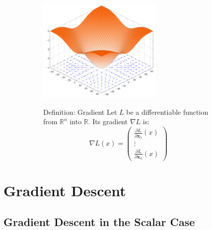 \documentclass{book}
\newcommand{\x}{\mathbf{x}}
\newcommand{\loss}{L}
\newcommand{\R}{\mathbb{R}}
\begin{document}
\begin{figure}[h]
    \centering
    \begin{subfigure}{.6\textwidth}
        \includegraphics[height=5cm]{3d-gradient-cos.png}
    \end{subfigure}
    \begin{subfigure}{.4\textwidth}
        \begin{block}{Definition: Gradient}
        Let $\loss$ be a differentiable function from $\R^n$ into $\R$. Its gradient $\nabla\loss$ is:
        \[
        \nabla \loss (x) =
        \begin{pmatrix}
        \frac{\partial \loss}{\partial \x_1}(x) \\
        \vdots \\
        \frac{\partial \loss}{\partial \x_n}(x)
        \end{pmatrix}
        \]
        \end{block}
    \end{subfigure}
\end{figure}

\section{Gradient Descent}

\subsection{Gradient Descent in the Scalar Case}
\end{document}
